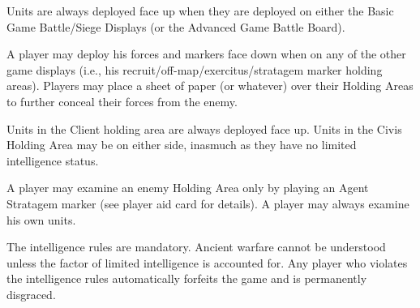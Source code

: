 Units are always deployed face up when they are deployed on either the Basic Game Battle/Siege Displays (or the Advanced Game Battle Board).

A player may deploy his forces and markers face down when on any of the other game displays (i.e., his recruit/off-map/exercitus/stratagem marker holding areas). Players may place a sheet of paper (or whatever) over their Holding Areas to further conceal their forces from the enemy.

Units in the Client holding area are always deployed face up. Units in the Civis Holding Area may be on either side, inasmuch as they have no limited intelligence status.

A player may examine an enemy Holding Area only by playing an Agent Stratagem marker (see player aid card for details). A player may always examine his own units.

The intelligence rules are mandatory. Ancient warfare cannot be understood unless the factor of limited intelligence is accounted for. Any player who violates the intelligence rules automatically forfeits the game and is permanently disgraced.
